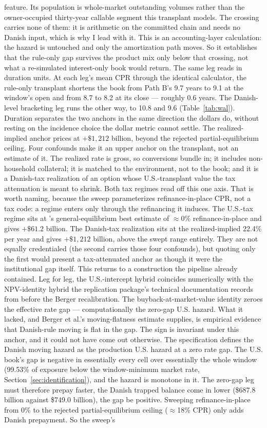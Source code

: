 \documentclass[12pt]{article}
\begin{document}
feature. Its population is whole-market outstanding volumes rather than the owner-occupied thirty-year callable segment this transplant models. The crossing carries none of them: it is arithmetic on the committed chain and needs no Danish input, which is why I lead with it. This is an accounting-layer calculation: the hazard is untouched and only the amortization path moves. So it establishes that the rule-only gap survives the product mix only below that crossing, not what a re-simulated interest-only book would return. The same leg reads in duration units. At each leg's mean CPR through the identical calculator, the rule-only transplant shortens the book from Path B's 9.7 years to 9.1 at the window's open and from 8.7 to 8.2 at its close --- roughly 0.6 years. The Danish-level bracketing leg runs the other way, to 10.8 and 9.6 (Table~\ref{tab:wal}). Duration separates the two anchors in the same direction the dollars do, without resting on the incidence choice the dollar metric cannot settle. The realized-implied anchor prices at $+\$1{,}212$ billion, beyond the rejected partial-equilibrium ceiling. Four confounds make it an upper anchor on the transplant, not an estimate of it. The realized rate is gross, so conversions bundle in; it includes non-household collateral; it is matched to the environment, not to the book; and it is a Danish-tax realization of an option whose U.S.-transplant value the tax attenuation is meant to shrink. Both tax regimes read off this one axis. That is worth naming, because the sweep parameterizes refinance-in-place CPR, not a tax code: a regime enters only through the refinancing it induces. The U.S.-tax regime sits at \citeauthor{berger2026}'s general-equilibrium best estimate of $\approx$0\% refinance-in-place and gives $+\$61.2$ billion. The Danish-tax realization sits at the realized-implied 22.4\% per year and gives $+\$1{,}212$ billion, above the swept range entirely. They are not equally credentialed (the second carries those four confounds), but quoting only the first would present a tax-attenuated anchor as though it were the institutional gap itself. This returns to a construction the pipeline already contained. Leg for leg, the U.S.-intercept hybrid coincides numerically with the NPV-identity hybrid the replication package's technical documentation records from before the Berger recalibration. The buyback-at-market-value identity zeroes the effective rate gap --- computationally the zero-gap U.S. hazard. What it lacked, and Berger et al.'s moving-flatness estimate supplies, is empirical evidence that Danish-rule moving is flat in the gap. The sign is invariant under this anchor, and it could not have come out otherwise. The specification defines the Danish moving hazard as the production U.S. hazard at a zero rate gap. The U.S. book's gap is negative in essentially every cell over essentially the whole window (99.53\% of exposure below the window-minimum market rate, Section~\ref{sec:identification}), and the hazard is monotone in it. The zero-gap leg must therefore prepay faster, the Danish trapped balance come in lower (\$687.8 billion against \$749.0 billion), the gap be positive. Sweeping refinance-in-place from 0\% to the rejected partial-equilibrium ceiling ($\approx$18\% CPR) only adds Danish prepayment. So the sweep's 
\end{document}
